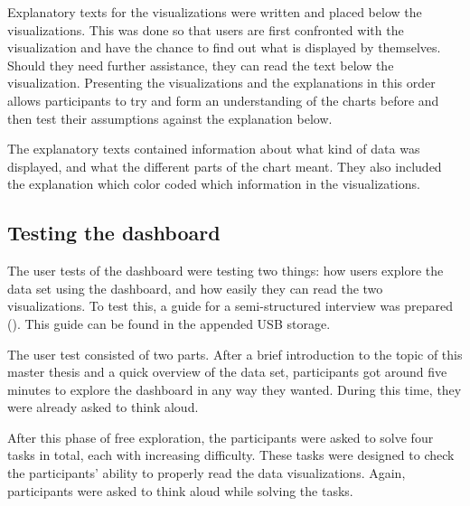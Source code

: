 Explanatory texts for the visualizations were written and placed below the visualizations. This was done so that users are first confronted with the visualization and have the chance to find out what is displayed by themselves. Should they need further assistance, they can read the text below the visualization. Presenting the visualizations and the explanations in this order allows participants to try and form an understanding of the charts before and then test their assumptions against the explanation below.

The explanatory texts contained information about what kind of data was displayed, and what the different parts of the chart meant. They also included the explanation which color coded which information in the visualizations.

\subsection{Testing the dashboard}
The user tests of the dashboard were testing two things: how users explore the data set using the dashboard, and how easily they can read the two visualizations. To test this, a guide for a semi-structured interview was prepared (\cite[315ff.]{schnell1999methoden}). This guide can be found in the appended USB storage.

The user test consisted of two parts. After a brief introduction to the topic of this master thesis and a quick overview of the data set, participants got around five minutes to explore the dashboard in any way they wanted. During this time, they were already asked to think aloud.

After this phase of free exploration, the participants were asked to solve four tasks in total, each with increasing difficulty. These tasks were designed to check the participants' ability to properly read the data visualizations. Again, participants were asked to think aloud while solving the tasks.

